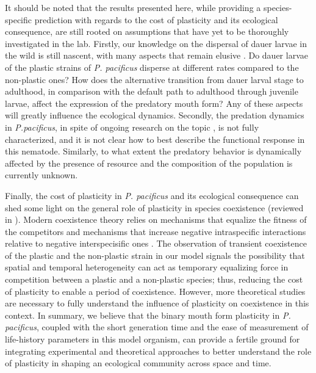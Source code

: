 \documentclass[10pt,letterpaper]{article}
\newcommand{\ppac}{\emph{P. pacificus}}
\begin{document}
It should be noted that the results presented here, while providing a species-specific prediction with regards to the cost of plasticity and its ecological consequence, are still rooted on assumptions that have yet to be thoroughly investigated in the lab. Firstly, our knowledge on the dispersal of dauer larvae in the wild is still nascent, with many aspects that remain elusive \cite{Renahan2021aa, Renahan2022a}. Do dauer larvae of the plastic strains of \ppac{} disperse at different rates compared to the non-plastic ones? How does the alternative transition from dauer larval stage to adulthood, in comparison with the default path to adulthood through juvenile larvae, affect the expression of the predatory mouth form? Any of these aspects will greatly influence the ecological dynamics. Secondly, the predation dynamics in \emph{P.pacificus}, in spite of ongoing research on the topic \cite{Lightfoot2021a}, is not fully characterized, and it is not clear how to best describe the functional response in this nematode. Similarly, to what extent the predatory behavior is dynamically affected by the presence of resource and the composition of the population is currently unknown. 

\hspace{5cm}

Finally, the cost of plasticity in \ppac{} and its ecological consequence can shed some light on the general role of plasticity in species coexistence (reviewed in \cite{Turcotte2016}). Modern coexistence theory relies on mechanisms that equalize the fitness of the competitors and mechanisms that increase negative intraspecific interactions relative to negative interspecisific ones \cite{Chesson2000}. The observation of transient coexistence of the plastic and the non-plastic strain in our model signals the possibility that spatial and temporal heterogeneity can act as temporary equalizing force in competition between a plastic and a non-plastic species; thus, reducing the cost of plasticity to enable a period of coexistence. However, more theoretical studies are necessary to fully understand the influence of plasticity on coexistence in this context. In summary, we believe that the binary mouth form plasticity in \ppac{}, coupled with the short generation time and the ease of measurement of life-history parameters in this model organism, can provide a fertile  ground for integrating experimental and theoretical approaches to better understand the role of plasticity in shaping an ecological community across space and time.
\end{document}
